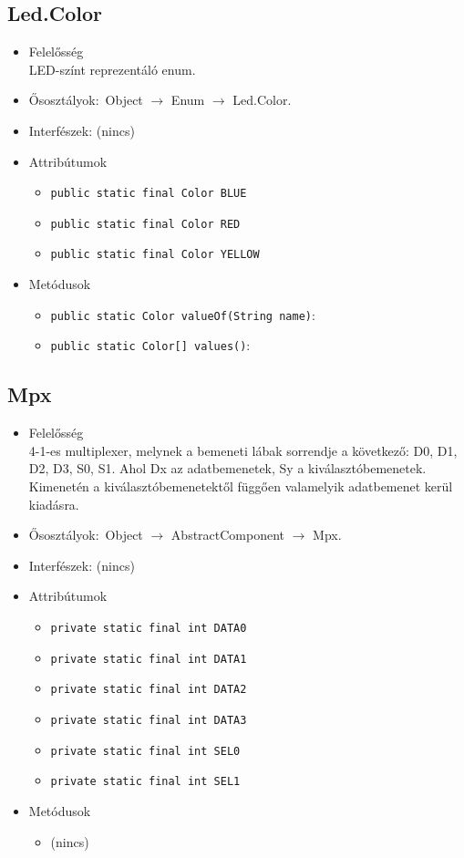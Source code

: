 \subsection{Led.Color}
\begin{itemize}
\item Felelősség\\
LED-színt reprezentáló enum.
\item Ősosztályok:\ Object $\rightarrow{}$ Enum $\rightarrow{}$ Led.Color.
\item Interfészek: (nincs)
\item Attribútumok $\ $
\begin{itemize}
	\item \texttt{public static final Color BLUE} 
	\item \texttt{public static final Color RED} 
	\item \texttt{public static final Color YELLOW} 
\end{itemize}
\item Metódusok$\ $
\begin{itemize}
	\item \texttt{public static Color valueOf(String name)}: 
	\item \texttt{public static Color[] values()}: 
\end{itemize}
\end{itemize}

\subsection{Mpx}
\begin{itemize}
\item Felelősség\\
4-1-es multiplexer, melynek a bemeneti lábak sorrendje a következő:  D0, D1, D2, D3, S0, S1. Ahol Dx az adatbemenetek, Sy a kiválasztóbemenetek.  Kimenetén a kiválasztóbemenetektől függően valamelyik adatbemenet kerül kiadásra.
\item Ősosztályok:\ Object $\rightarrow{}$ AbstractComponent $\rightarrow{}$ Mpx.
\item Interfészek: (nincs)
\item Attribútumok $\ $
\begin{itemize}
	\item \texttt{private static final int DATA0} 
	\item \texttt{private static final int DATA1} 
	\item \texttt{private static final int DATA2} 
	\item \texttt{private static final int DATA3} 
	\item \texttt{private static final int SEL0} 
	\item \texttt{private static final int SEL1} 
\end{itemize}
\item Metódusok$\ $
\begin{itemize}
\item (nincs)
\end{itemize}
\end{itemize}


